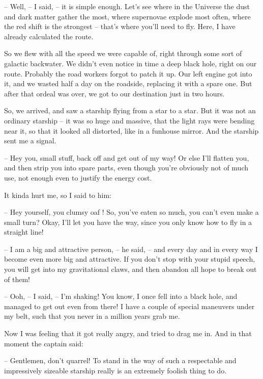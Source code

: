 \documentclass[ebook,twoside,final,openright]{memoir}
\begin{document}
– Well, – I said, – it is simple enough. Let's see where in the Universe the dust and dark matter gather the most, where supernovae explode most often, where the red shift is the strongest – that’s where you’ll need to fly. Here, I have already calculated the route.\par
So we flew with all the speed we were capable of, right through some sort of galactic backwater. We didn’t even notice in time a deep black hole, right on our route. Probably the road workers forgot to patch it up. Our left engine got into it, and we wasted half a day on the roadside, replacing it with a spare one. But after that ordeal was over, we got to our destination just in two hours.\par
\par
So, we arrived, and saw a starship flying from a star to a star. But it was not an ordinary starship – it was so huge and massive, that the light rays were bending near it, so that it looked all distorted, like in a funhouse mirror. And the starship sent me a signal.\par
– Hey you, small stuff, back off and get out of my way! Or else I’ll flatten you, and then strip you into spare parts, even though you’re obviously not of much use, not enough even to justify the energy cost.\par
It kinda hurt me, so I said to him:\par
– Hey yourself, you clumsy oaf ! So, you’ve eaten so much, you can’t even make a small turn? Okay, I’ll let you have the way, since you only know how to fly in a straight line!\par
– I am a big and attractive person, – he said, – and every day and in every way I become even more big and attractive. If you don’t stop with your stupid speech, you will get into my gravitational claws, and then abandon all hope to break out of them!\par
– Ooh, – I said, – I’m shaking! You know, I once fell into a black hole, and managed to get out even from there! I have a couple of special maneuvers under my belt, such that you never in a million years grab me.\par
\par
Now I was feeling that it got really angry, and tried to drag me in. And in that moment the captain said:\par
– Gentlemen, don’t quarrel! To stand in the way of such a respectable and impressively sizeable starship really is an extremely foolish thing to do.\par
\end{document}
